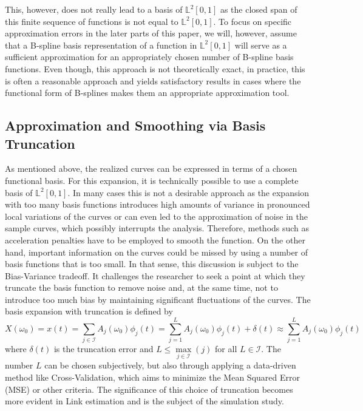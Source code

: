 \documentclass[11pt,twoside,a4paper]{article}
\begin{document}
	This, however, does not really lead to a basis of $\mathbb{L}^2[0,1]$ as the closed span of this finite sequence of functions is not equal to $\mathbb{L}^2[0,1]$. To focus on specific approximation errors in the later parts of this paper, we will, however, assume that a B-spline basis representation of a function in $\mathbb{L}^2[0,1]$ will serve as a sufficient approximation for an appropriately chosen number of B-spline basis functions. 
	Even though, this approach is not theoretically exact, in practice, this is often a reasonable approach and yields satisfactory results in cases where the functional form of B-splines makes them an appropriate approximation tool. 
	
	\subsection{Approximation and Smoothing via Basis Truncation}
	As mentioned above, the realized curves can be expressed in terms of a chosen functional basis. For this expansion, it is technically possible to use a complete basis of $\mathbb{L}^2[0,1]$. In many cases this is not a desirable approach as the expansion with too many basis functions introduces high amounts of variance in pronounced local variations of the curves or can even led to the approximation of noise in the sample curves, which possibly interrupts the analysis. {\color{red} Therefore, methods such as acceleration penalties have to be employed to smooth the function.} On the other hand, important information on the curves could be missed by using a number of basis functions that is too small. In that sense, this discussion is subject to the Bias-Variance tradeoff. It challenges the researcher to seek a point at which they truncate the basis function to remove noise and, at the same time, not to introduce too much bias by maintaining significant fluctuations of the curves. The basis expansion with truncation is defined by
	\begin{equation}
		X(\omega_0) = x(t) = \sum_{j \in \mathcal{I}} A_j(\omega_0) \phi_j(t) = \sum_{j = 1}^{L} A_j(\omega_0) \phi_j(t) + \delta(t) \approx \sum_{j = 1}^{L} A_j(\omega_0) \phi_j(t)
	\end{equation}
	where $\delta(t)$ is the truncation error and $L \leq \max\limits_{j \in \mathcal{I}}(j)$ for all $L \in \mathcal{I}$. The number $L$ can be chosen subjectively, but also through applying a data-driven method like Cross-Validation, which aims to minimize the Mean Squared Error (MSE) or other criteria. The significance of this choice of truncation becomes more evident in {\color{green} Link estimation} and is the subject of the simulation study. 
	
\end{document}
